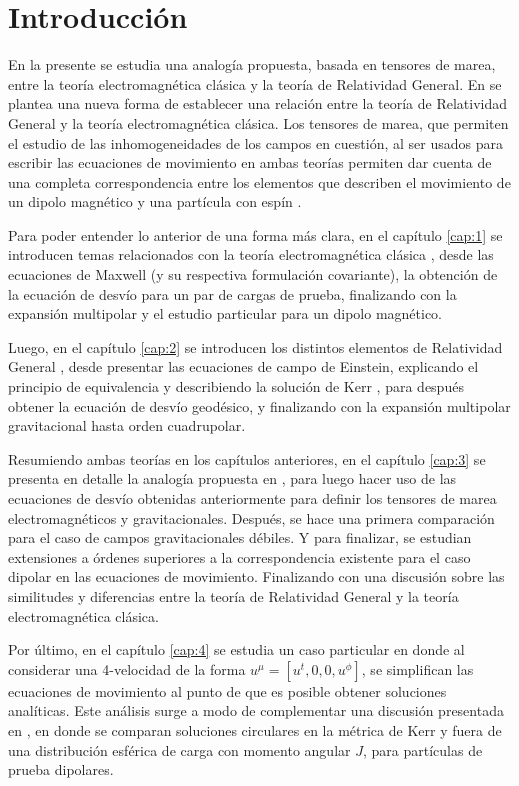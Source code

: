 \chapter*{Introducci\'on}

En la presente se estudia una analogía propuesta, basada en tensores de marea, entre la teoría electromagnética clásica y la teoría de Relatividad General. En \cite{Costa-Herdeiro} se plantea una nueva forma de establecer una relación entre la teoría de Relatividad General y la teoría electromagnética clásica. Los tensores de marea, que permiten el estudio de las inhomogeneidades de los campos en cuestión, al ser usados para escribir las ecuaciones de movimiento en ambas teorías permiten dar cuenta de una completa correspondencia entre los elementos que describen el movimiento de un dipolo magnético y una partícula con espín \cite{Steinhoff-Puetzfeld}.

Para poder entender lo anterior de una forma más clara, en el capítulo \ref{cap:1} se introducen temas relacionados con la teoría electromagnética clásica \cite{gr2}, desde las ecuaciones de Maxwell (y su respectiva formulación covariante), la obtención de la ecuación de desvío para un par de cargas de prueba, finalizando con la expansión multipolar \cite{Dixon1,Dixon2,Dixon3} y el estudio particular para un dipolo magnético.

Luego, en el capítulo \ref{cap:2} se introducen los distintos elementos de Relatividad General \cite{gr1,inverno,Steven,Hans,Poisson}, desde presentar las ecuaciones de campo de Einstein, explicando el principio de equivalencia y describiendo la solución de Kerr \cite{Heinicke}, para después obtener la ecuación de desvío geodésico, y finalizando con la expansión multipolar gravitacional hasta orden cuadrupolar.

Resumiendo ambas teorías en los capítulos anteriores, en el capítulo \ref{cap:3} se presenta en detalle la analogía propuesta en \cite{Costa-Herdeiro}, para luego hacer uso de las ecuaciones de desvío obtenidas anteriormente para definir los tensores de marea electromagnéticos y gravitacionales. Después, se hace una primera comparación para el caso de campos gravitacionales débiles. Y para finalizar, se estudian extensiones a órdenes superiores a la correspondencia existente para el caso dipolar en las ecuaciones de movimiento. Finalizando con una discusión sobre las similitudes y diferencias entre la teoría de Relatividad General y la teoría electromagnética clásica.

\newpage
Por último, en el capítulo \ref{cap:4} se estudia un caso particular en donde al considerar una 4-velocidad de la forma $u^{\mu}=\left[ u^t, 0, 0, u^{\phi} \right]$, se simplifican las ecuaciones de movimiento al punto de que es posible obtener soluciones analíticas. Este análisis surge a modo de complementar una discusión presentada en \cite{Costa-Natario-Zilhao}, en donde se comparan soluciones circulares en la métrica de Kerr y fuera de una distribución esférica de carga con momento angular $J$, para partículas de prueba dipolares.